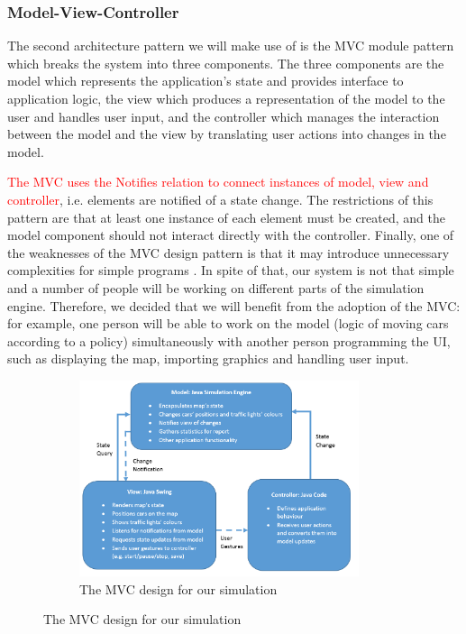 \documentclass{article}
\begin{document}
	\subsubsection{Model-View-Controller}
	The second architecture pattern we will make use of is the MVC module pattern which breaks the system into three components. 
	The three components are the model which represents the application's state and provides interface to application logic, the view which produces a representation of the model to the user and handles user input, and the controller which manages the interaction between the model and the view by translating user actions into changes in the model. 
	
	\textcolor{red}{The MVC uses the Notifies relation to connect instances of model, view and controller}, i.e. elements are notified of a state change. 
	The restrictions of this pattern are that at least one instance of each element must be created, and the model component should not interact directly with the controller. 
	Finally, one of the weaknesses of the MVC design pattern is that it may introduce unnecessary complexities for simple programs \cite{bass2007software}. 
	In spite of that, our system is not that simple and a number of people will be working on different parts of the simulation engine. Therefore, we decided that we will benefit from the adoption of the MVC: for example, one person will be able to work on the model (logic of moving cars according to a policy) simultaneously with another person programming the UI, such as displaying the map, importing graphics and handling user input. 
	
	\begin{figure}[H]
		\centering
		\begin{subfigure}{0.8\textwidth}
			\centering
			\includegraphics[width=0.9\textwidth]{mvc}
			\caption{The MVC design for our simulation}
			\label{OurMvc}
		\end{subfigure}
		
		
	\end{figure}
	
\end{document}

